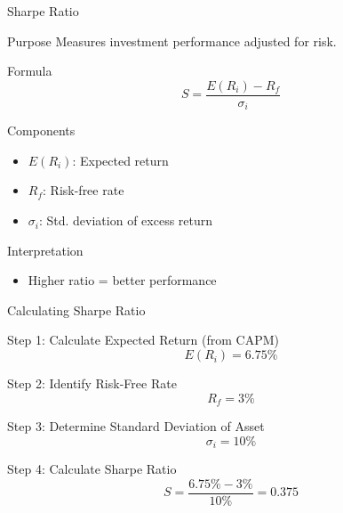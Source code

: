 \documentclass{beamer}
\begin{document}
\begin{frame}{Sharpe Ratio}
    \begin{block}{Purpose}
        Measures investment performance adjusted for risk.
    \end{block}
    \begin{block}{Formula}
        \begin{equation*}
            S = \frac{E(R_i) - R_f}{\sigma_i}
        \end{equation*}
    \end{block}
    \begin{block}{Components}
        \begin{itemize}
            \item \(E(R_i)\): Expected return
            \item \(R_f\): Risk-free rate
            \item \(\sigma_i\): Std. deviation of excess return
        \end{itemize}
    \end{block}
    \begin{block}{Interpretation}
        \begin{itemize}
            \item Higher ratio = better performance
        \end{itemize}
    \end{block}
\end{frame}





\begin{frame}{Calculating Sharpe Ratio}
    \begin{block}{Step 1: Calculate Expected Return (from CAPM)}
        \begin{equation*}
            E(R_i) = 6.75\%
        \end{equation*}
    \end{block}
    \begin{block}{Step 2: Identify Risk-Free Rate}
        \begin{equation*}
            R_f = 3\%
        \end{equation*}
    \end{block}
    \begin{block}{Step 3: Determine Standard Deviation of Asset}
        \begin{equation*}
            \sigma_i = 10\%
        \end{equation*}
    \end{block}
    \begin{block}{Step 4: Calculate Sharpe Ratio}
        \begin{equation*}
            S = \frac{6.75\% - 3\%}{10\%} = 0.375
        \end{equation*}
    \end{block}
\end{frame}
\end{document}
